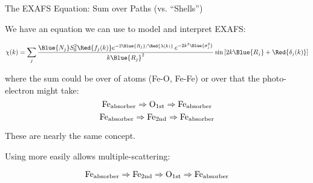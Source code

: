\begin{slide}{The EXAFS Equation: Sum over Paths (vs. ``Shells'')}
    
  We have an equation we can use to model and interpret EXAFS:
    
  \begin{center}
      \begin{minipage}{100mm} 
        \[ \chi(k) = \sum_j \frac{ {\Blue{N_j}} S_0^2 {\Red{f_j(k)}}
            e^{-2{\Blue{R_j}}/{\Red{\lambda(k)}}}\, 
            e^{-2k^2{\Blue{\sigma_j^2}}}}{k{\Blue{R_j}}^2}
          \sin{ [ 2k{\Blue{R_j}} + \Red{\delta_j(k)} ]} \] \end{minipage}
    \end{center}

    \vmm \pause

    where the sum could be over {} of atoms (Fe-O, Fe-Fe)
    or over {} that the photo-electron might
    take:
    \[ \rm Fe_{\rm absorber} \Rightarrow O_{\rm 1st} \Rightarrow Fe_{\rm absorber} \]
    \[ \rm Fe_{\rm absorber}\Rightarrow Fe_{\rm 2nd} \Rightarrow Fe_{\rm absorber} \]

    \pause\vmm
    These are nearly the same concept.\par
    
    \vmm
    Using {} more easily allows
    multiple-scattering:

    \[ \rm Fe_{\rm absorber}\Rightarrow Fe_{\rm 2nd} \Rightarrow O_{\rm
      1st} \Rightarrow Fe_{\rm absorber} \]    
      


\end{slide} 
